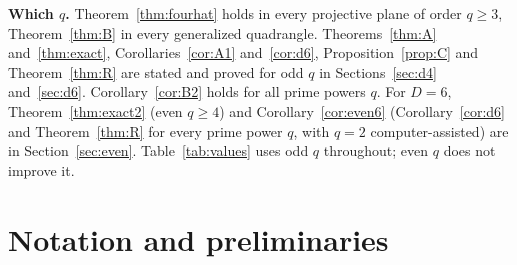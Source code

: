 \documentclass[11pt]{amsart}
\theoremstyle{definition}
\theoremstyle{remark}
\begin{document}
\smallskip\noindent\textbf{Which $q$.} Theorem~\ref{thm:fourhat} holds in every projective plane of order $q\ge3$, Theorem~\ref{thm:B} in every generalized quadrangle. Theorems~\ref{thm:A} and~\ref{thm:exact}, Corollaries~\ref{cor:A1} and~\ref{cor:d6}, Proposition~\ref{prop:C} and Theorem~\ref{thm:R} are stated and proved for odd $q$ in Sections~\ref{sec:d4} and~\ref{sec:d6}. Corollary~\ref{cor:B2} holds for all prime powers $q$. For $D=6$, Theorem~\ref{thm:exact2} (even $q\ge4$) and Corollary~\ref{cor:even6} (Corollary~\ref{cor:d6} and Theorem~\ref{thm:R} for every prime power $q$, with $q=2$ computer-assisted) are in Section~\ref{sec:even}. Table~\ref{tab:values} uses odd $q$ throughout; even $q$ does not improve it.

\section{Notation and preliminaries}\label{sec:prelim}
\end{document}
